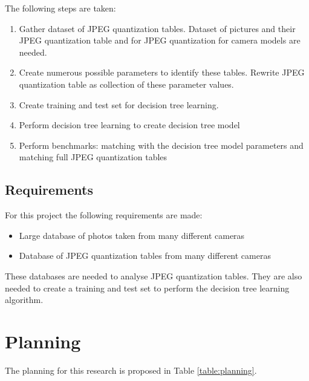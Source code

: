 \documentclass[a4paper,8pt]{article}
\begin{document}
\noindent The following steps are taken:
\begin{enumerate}
\item Gather dataset of JPEG quantization tables. Dataset of pictures and their JPEG quantization table and for JPEG quantization for camera models are needed.
\item Create numerous possible parameters to identify these tables. Rewrite JPEG quantization table as collection of these parameter values.
\item Create training and test set for decision tree learning.
\item Perform decision tree learning to create decision tree model
\item Perform benchmarks: matching with the decision tree model parameters and matching full JPEG quantization tables
\end{enumerate}


\subsection*{Requirements}

For this project the following requirements are made:

\begin{itemize}
\item Large database of photos taken from many different cameras
\item Database of JPEG quantization tables from many different cameras
\end{itemize}

\noindent These databases are needed to analyse JPEG quantization tables. They are also needed to create a training and test set to perform the decision tree learning algorithm.
\section*{Planning}
The planning for this research is proposed in Table \ref{table:planning}.
\end{document}

